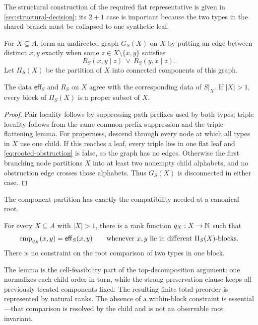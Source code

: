 The structural construction of the required flat representative is given in
\autoref{sec:structural-decision}; its \(2+1\) case is important because the two
types in the shared branch must be collapsed to one synthetic leaf.

For \(X\subseteq A\), form an undirected graph \(G_S(X)\) on \(X\) by putting
an edge between distinct \(x,y\) exactly when some
\(z\in X\setminus\{x,y\}\) satisfies
\begin{equation}
  R_S(x,y\mid z)\ \lor\ R_S(y,x\mid z).
  \label{eq:obstruction-edge}
\end{equation}
Let \(\Pi_S(X)\) be the partition of \(X\) into connected components of this
graph.

\begin{lemma}
\label{lem:canonical-properness}
The data \(\mathsf{eff}_S\) and \(R_S\) on \(X\) agree with the corresponding
data of \(S|_X\).  If \(|X|>1\), every block of \(\Pi_S(X)\) is a proper
subset of \(X\).
\end{lemma}

\begin{proof}
Pair locality follows by suppressing path prefixes used by both types; triple
locality follows from the same common-prefix suppression and the
triple-flattening lemma.  For properness, descend through every node at which
all types in \(X\) use one child.  If this reaches a leaf, every triple lies in
one flat leaf and \autoref{eq:rooted-obstruction} is false, so the graph has no
edges.  Otherwise the first branching node partitions \(X\) into at least two
nonempty child alphabets, and no obstruction edge crosses those alphabets.
Thus \(G_S(X)\) is disconnected in either case.
\end{proof}

The component partition has exactly the compatibility needed at a canonical
root.

\begin{lemma}
\label{lem:canonical-cell-feasibility}
For every \(X\subseteq A\) with \(|X|>1\), there is a rank function
\(q_X:X\to\mathbb{N}\) such that
\begin{equation}
  \operatorname{cmp}_{q_X}(x,y)=\mathsf{eff}_S(x,y)
  \qquad
  \text{whenever \(x,y\) lie in different \(\Pi_S(X)\)-blocks.}
  \label{eq:canonical-cell-feasibility}
\end{equation}
There is no constraint on the root comparison of two types in one block.
\end{lemma}

The lemma is the cell-feasibility part of the top-decomposition argument: one
normalizes each child order in turn, while the strong preservation clause
keeps all previously treated components fixed.  The resulting finite total
preorder is represented by natural ranks.  The absence of a within-block
constraint is essential---that comparison is resolved by the child and is
not an observable root invariant.

